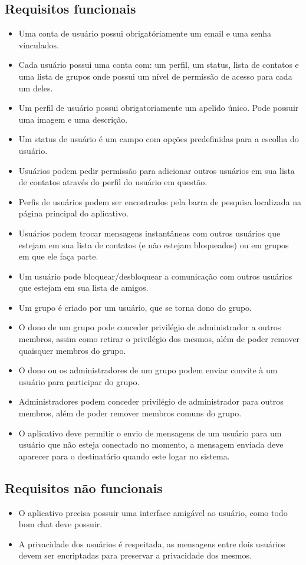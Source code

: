 \documentclass[11pt,a4paper,titlepage]{article}
\begin{document}
\subsection{Requisitos funcionais}
\begin{itemize}
\item Uma conta de usuário possui obrigatóriamente um email e uma senha vinculados.
\item Cada usuário possui uma conta com: um perfil, um status, lista de contatos e uma lista de grupos onde possui um nível de permissão de acesso para cada um deles.
\item Um perfil de usuário possui obrigatoriamente um apelido único. Pode possuir uma imagem e uma descrição.
\item Um status de usuário é um campo com opções predefinidas para a escolha do usuário.
\item Usuários podem pedir permissão para adicionar outros usuários em sua lista de contatos através do perfil do usuário em questão.
\item Perfis de usuários podem ser encontrados pela barra de pesquisa localizada na página principal do aplicativo.
\item Usuários podem trocar mensagens instantâneas com outros usuários que estejam em sua lista de contatos (e não estejam bloqueados) ou em grupos em que ele faça parte.
\item Um usuário pode bloquear/desbloquear a comunicação com outros usuários que estejam em sua lista de amigos.
\item Um grupo é criado por um usuário, que se torna dono do grupo.
\item O dono de um grupo pode conceder privilégio de administrador a outros membros, assim como retirar o privilégio dos mesmos, além de poder remover quaisquer membros do grupo.
\item O dono ou os administradores de um grupo podem enviar convite à um usuário para participar do grupo.
\item Administradores podem conceder privilégio de administrador para outros membros, além de poder remover membros comuns do grupo.
\item O aplicativo deve permitir o envio de mensagens de um usuário para um usuário que não esteja conectado no momento, a mensagem enviada deve aparecer para o destinatário quando este logar no sistema.
\end{itemize}
\subsection{Requisitos não funcionais}
\begin{itemize}
\item O aplicativo precisa possuir uma interface amigável ao usuário, como todo bom chat deve possuir.
\item A privacidade dos usuários é respeitada, as mensagens entre dois usuários devem ser encriptadas para preservar a privacidade dos mesmos.
\end{itemize}
\end{document}
